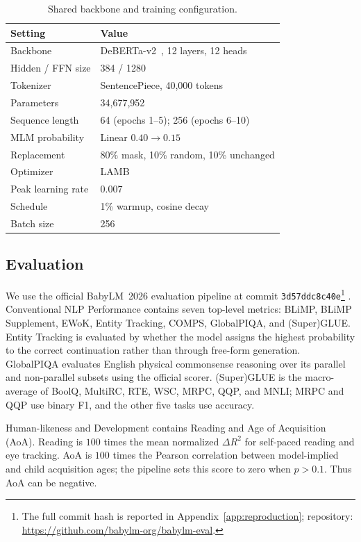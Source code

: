 \documentclass[11pt,a4paper]{article}
\begin{document}
\begin{table}[t]
\centering
\small
\setlength{\tabcolsep}{4pt}
\begin{tabular}{@{}p{}p{}@{}}
\toprule
\textbf{Setting} & \textbf{Value} \\
\midrule
Backbone & DeBERTa-v2~\cite{he2021deberta}, 12 layers, 12 heads \\
Hidden / FFN size & 384 / 1280 \\
Tokenizer & SentencePiece, 40,000 tokens \\
Parameters & 34,677,952 \\
Sequence length & 64 (epochs 1--5); 256 (epochs 6--10) \\
MLM probability & Linear $0.40\rightarrow0.15$ \\
Replacement & 80\% mask, 10\% random, 10\% unchanged \\
Optimizer & LAMB~\cite{you2020lamb} \\
Peak learning rate & 0.007 \\
Schedule & 1\% warmup, cosine decay \\
Batch size & 256 \\
\bottomrule
\end{tabular}
\caption{Shared backbone and training configuration.}
\label{tab:shared-training}
\end{table}

\subsection{Evaluation}
\label{sec:evaluation}

We use the official BabyLM~2026 evaluation pipeline at commit
\texttt{3d57ddc8c40e}\footnote{The full commit hash is reported in
Appendix~\ref{app:reproduction}; repository:
\url{https://github.com/babylm-org/babylm-eval}.}
\citep{choshen2026babylmturns4papers}. Conventional NLP Performance
contains seven top-level metrics: BLiMP, BLiMP Supplement, EWoK,
Entity Tracking, COMPS, GlobalPIQA, and (Super)GLUE. Entity Tracking is
evaluated by whether the model assigns the highest probability to the
correct continuation rather than through free-form generation.
GlobalPIQA evaluates English physical commonsense reasoning over its
parallel and non-parallel subsets using the official scorer.
(Super)GLUE is the macro-average of BoolQ, MultiRC, RTE, WSC, MRPC,
QQP, and MNLI; MRPC and QQP use binary F1, and the other five tasks use
accuracy.

Human-likeness and Development contains Reading and Age of Acquisition
(AoA). Reading is $100$ times the mean normalized $\Delta R^2$ for
self-paced reading and eye tracking. AoA is $100$ times the Pearson
correlation between model-implied and child acquisition ages; the
pipeline sets this score to zero when $p>0.1$. Thus AoA can be negative.
\end{document}
